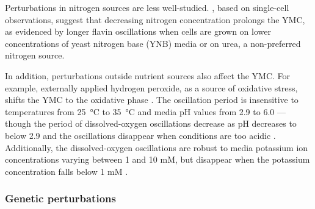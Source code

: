 Perturbations in nitrogen sources are less well-studied.
\textcite{baumgartnerFlavinbasedMetabolicCycles2018}, based on single-cell observations, suggest that decreasing nitrogen concentration prolongs the YMC, as evidenced by longer flavin oscillations when cells are grown on lower concentrations of yeast nitrogen base (YNB) media or on urea, a non-preferred nitrogen source.

In addition, perturbations outside nutrient sources also affect the YMC.\@
For example, externally applied hydrogen peroxide, as a source of oxidative stress, shifts the YMC to the oxidative phase \parencite{amponsahPeroxiredoxinsCoupleMetabolism2021}.
The oscillation period is insensitive to temperatures from \SI{25}{\celsius} to \SI{35}{\celsius} and media pH values from
2.9 to 6.0 \parencite{lloydUltradianMetronomeTimekeeper2005} --- though the period of dissolved-oxygen oscillations decrease as pH decreases to below 2.9 and the oscillations disappear when conditions are too acidic \parencite{oneillEukaryoticCellBiology2020}.
Additionally, the dissolved-oxygen oscillations are robust to media potassium ion concentrations varying between 1 and 10 mM, but disappear when the potassium concentration falls below 1 mM \parencite{oneillEukaryoticCellBiology2020}.


\subsubsection{Genetic perturbations}
\label{subsubsec:intro-ymc-perturbations-genetic}

